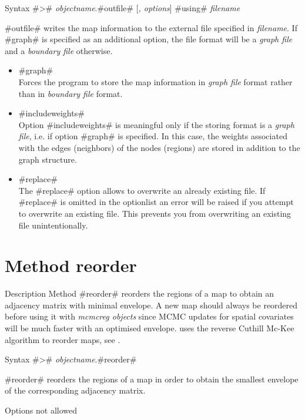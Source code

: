 \begin{stanza}{Syntax}
#># {\em objectname}.#outfile# [{\em , options}] #using# {\em filename}

#outfile# writes the map information to the external file specified in {\em filename}. If #graph# is specified as an
additional option, the file format will be a {\em graph file} and a {\em boundary file} otherwise.
\end{stanza}

\begin{itemize}
\item #graph# \\
Forces the program to store the map information in {\em graph file} format rather than in {\em boundary file} format.
\item #includeweights# \\
Option #includeweights# is meaningful only if the storing format is a {\em graph file}, i.e. if option #graph# is specified. In this case, the weights associated with the edges (neighbors) of the nodes (regions) are stored in addition to the graph structure.
\item #replace# \\
The #replace# option allows \BayesX to overwrite an already existing file. If #replace# is omitted in the optionlist an error will be raised if you attempt to overwrite an existing file. This prevents you from overwriting an existing file unintentionally.
\end{itemize}


\section{Method reorder}
 \label{mapreorder}

\begin{stanza}{Description}
Method #reorder# reorders the regions of a map to obtain an adjacency matrix with minimal envelope. A new map should always be reordered before using it with {\em mcmcreg objects} since MCMC updates for spatial covariates will be much faster with an optimised envelope. \BayesX uses the reverse Cuthill Mc-Kee algorithm to reorder maps, see .
\end{stanza}

\begin{stanza}{Syntax}
#># {\em objectname}.#reorder#

#reorder# reorders the regions of a map in order to obtain the smallest envelope of the corresponding adjacency matrix.
\end{stanza}

\begin{stanza}{Options}
not allowed
\end{stanza}

